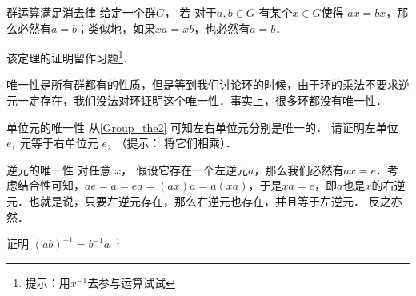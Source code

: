 \begin{theorem}{群运算满足消去律}\label{Group_the2}
给定一个群$G$， 若 对于$ a, b\in G$ 有某个$x\in G$使得 $ax=bx$，那么必然有$a=b$；类似地，如果$xa=xb$，也必然有$a=b$．
\end{theorem}

该定理的证明留作习题\footnote{提示：用$x^{-1}$去参与运算试试}．

唯一性是所有群都有的性质，但是等到我们讨论环的时候，由于环的乘法不要求逆元一定存在，我们没法对环证明这个唯一性．事实上，很多环都没有唯一性．

\begin{exercise}{单位元的唯一性}
从\autoref{Group_the2} 可知左右单位元分别是唯一的． 请证明左单位 $e_1$ 元等于右单位元 $e_2$ （提示： 将它们相乘）．
\end{exercise}

\begin{theorem}{逆元的唯一性}\label{Group_the1}
对任意 $x$， 假设它存在一个左逆元$a$，那么我们必然有$ax=e$．考虑结合性可知，$ae=a=ea=(ax)a=a(xa)$，于是$xa=e$，即$a$也是$x$的右逆元．也就是说，只要左逆元存在，那么右逆元也存在，并且等于左逆元． 反之亦然．
\end{theorem}

\begin{exercise}{}
证明 $(ab)^{-1} = b^{-1}a^{-1}$
\end{exercise}
